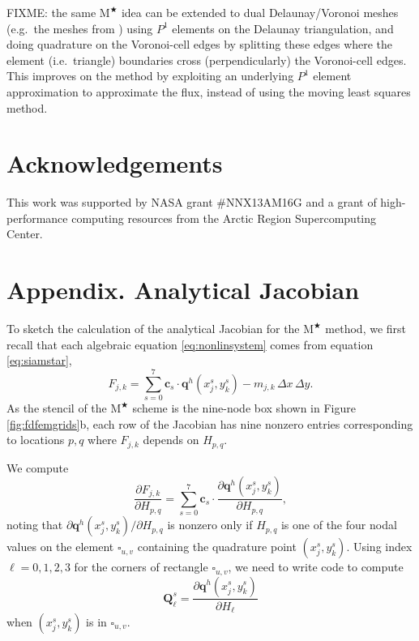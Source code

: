 \documentclass[twocolumn,letterpaper]{igs}
\newcommand\bc{\mathbf{c}}
\newcommand\bq{\mathbf{q}}
\newcommand\bQ{\mathbf{Q}}
\newcommand{\Mstar}{$\text{M}^{\bigstar}$\xspace}
\begin{document}
FIXME: the same \Mstar idea can be extended to dual Delaunay/Voronoi meshes (e.g.~the meshes from \cite{EgholmNielsen2010,Ringleretal2013}) using $P^1$ elements on the Delaunay triangulation, and doing quadrature on the Voronoi-cell edges by splitting these edges where the element (i.e.~triangle) boundaries cross (perpendicularly) the Voronoi-cell edges.  This improves on the \cite{EgholmNielsen2010} method by exploiting an underlying $P^1$ element approximation to approximate the flux, instead of using the moving least squares method.

\section*{Acknowledgements}
This work was supported by NASA grant \#NNX13AM16G and a grant of high-performance computing resources from the Arctic Region Supercomputing Center.





\appendix
\section{Appendix. Analytical Jacobian}  \label{sec:app}

To sketch the calculation of the analytical Jacobian for the \Mstar method, we first recall that each algebraic equation \eqref{eq:nonlinsystem} comes from equation \eqref{eq:siamstar},
\begin{equation}
  F_{j,k} = \sum_{s=0}^7 \bc_s\cdot \bq^h(x_j^s,y_k^s) - m_{j,k}\,\Delta x\,\Delta y.  \label{eq:res}
\end{equation}
As the stencil of the \Mstar scheme is the nine-node box shown in Figure \ref{fig:fdfemgrids}b, each row of the Jacobian has nine nonzero entries corresponding to locations $p,q$ where $F_{j,k}$ depends on $H_{p,q}$.

We compute
\begin{equation}
\frac{\partial F_{j,k}}{\partial H_{p,q}} = \sum_{s=0}^7 \bc_s\cdot \frac{\partial \bq^h(x_j^s,y_k^s)}{\partial H_{p,q}}, \label{eq:jacQsum}
\end{equation}
noting that $\partial \bq^h(x_j^s,y_k^s)/\partial H_{p,q}$ is nonzero only if $H_{p,q}$ is one of the four nodal values on the element $\square_{u,v}$ containing the quadrature point $(x_j^s,y_k^s)$.  Using index $\ell=0,1,2,3$ for the corners of rectangle $\square_{u,v}$, we need to write code to compute
\begin{equation}
\bQ_\ell^s = \frac{\partial \bq^h(x_j^s,y_k^s)}{\partial H_\ell} \label{eq:jacthegoal}
\end{equation}
when $(x_j^s,y_k^s)$ is in $\square_{u,v}$.
\end{document}
